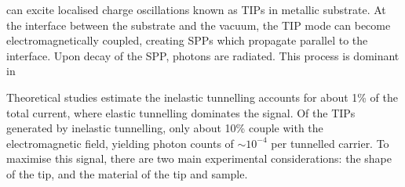 can excite localised charge oscillations known as \acp{TIP} in metallic substrate. At the interface between the substrate and the vacuum, the \ac{TIP} mode can become electromagnetically coupled, creating \acp{SPP} which propagate parallel to the interface. Upon decay of the \ac{SPP}, photons are radiated. This process is dominant in 

Theoretical studies estimate the inelastic tunnelling accounts for about 1\% of the total current,  where elastic tunnelling dominates the signal. Of the \acp{TIP} generated by inelastic tunnelling, only about 10\% couple with the electromagnetic field, yielding photon counts of $\sim 10^{-4}$ per tunnelled carrier. To maximise this signal, there are two main experimental considerations: the shape of the tip, and the material of the tip and sample.
